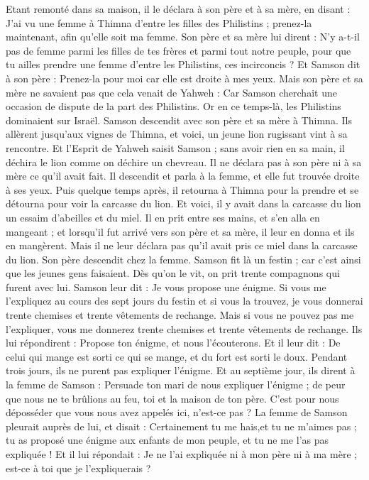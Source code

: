 \begin{multicols}{2}
Etant remonté dans sa maison, il le déclara à son père et à sa mère, en disant : J'ai vu une femme à Thimna d'entre les filles des Philistins ; prenez-la maintenant, afin qu'elle soit ma femme.
Son père et sa mère lui dirent : N'y a-t-il pas de femme parmi les filles de tes frères et parmi tout notre peuple, pour que tu ailles prendre une femme d'entre les Philistins, ces incirconcis ? Et Samson dit à son père : Prenez-la pour moi car elle est droite à mes yeux.
Mais son père et sa mère ne savaient pas que cela venait de Yahweh : Car Samson cherchait une occasion de dispute de la part des Philistins. Or en ce temps-là, les Philistins dominaient sur Israël.
Samson descendit avec son père et sa mère à Thimna. Ils allèrent jusqu'aux vignes de Thimna, et voici, un jeune lion rugissant vint à sa rencontre.
Et l'Esprit de Yahweh saisit Samson ; sans avoir rien en sa main, il déchira le lion comme on déchire un chevreau. Il ne déclara pas à son père ni à sa mère ce qu'il avait fait.
Il descendit et parla à la femme, et elle fut trouvée droite à ses yeux.
Puis quelque temps après, il retourna à Thimna pour la prendre et se détourna pour voir la carcasse du lion. Et voici, il y avait dans la carcasse du lion un essaim d'abeilles et du miel.
Il en prit entre ses mains, et s'en alla en mangeant ; et lorsqu'il fut arrivé vers son père et sa mère, il leur en donna et ils en mangèrent. Mais il ne leur déclara pas qu'il avait pris ce miel dans la carcasse du lion.
Son père descendit chez la femme. Samson fit là un festin ; car c'est ainsi que les jeunes gens faisaient.
Dès qu'on le vit, on prit trente compagnons qui furent avec lui.
Samson leur dit : Je vous propose une énigme. Si vous me l'expliquez au cours des sept jours du festin et si vous la trouvez, je vous donnerai trente chemises et trente vêtements de rechange.
Mais si vous ne pouvez pas me l'expliquer, vous me donnerez trente chemises et trente vêtements de rechange. Ils lui répondirent : Propose ton énigme, et nous l'écouterons.
Et il leur dit : De celui qui mange est sorti ce qui se mange, et du fort est sorti le doux. Pendant trois jours, ils ne purent pas expliquer l'énigme.
Et au septième jour, ils dirent à la femme de Samson : Persuade ton mari de nous expliquer l'énigme ; de peur que nous ne te brûlions au feu, toi et la maison de ton père. C'est pour nous déposséder que vous nous avez appelés ici, n'est-ce pas ?
La femme de Samson pleurait auprès de lui, et disait : Certainement tu me hais,et tu ne m'aimes pas ; tu as proposé une énigme aux enfants de mon peuple, et tu ne me l'as pas expliquée ! Et il lui répondait : Je ne l'ai expliquée ni à mon père ni à ma mère ; est-ce à toi que je l'expliquerais ?

\end{multicols}

